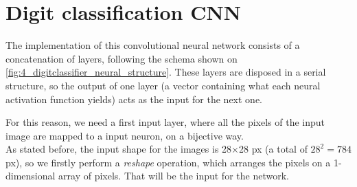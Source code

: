 	\section{Digit classification CNN}
		\label{sec:4_classif_cnn}
		The implementation of this convolutional neural network consists of a concatenation of layers, following the schema shown on \autoref{fig:4_digitclassifier_neural_structure}. These layers are disposed in a serial structure, so the output of one layer (a vector containing what each neural activation function yields) acts as the input for the next one.
		
		For this reason, we need a first input layer, where all the pixels of the input image are mapped to a input neuron, on a bijective way.\\
		
		As stated before, the input shape for the images is 28$\times$28 px (a total of $28^2 = 784$ px), so we firstly perform a \emph{reshape} operation, which arranges the pixels on a 1-dimensional array of pixels. That will be the input for the network.
		
